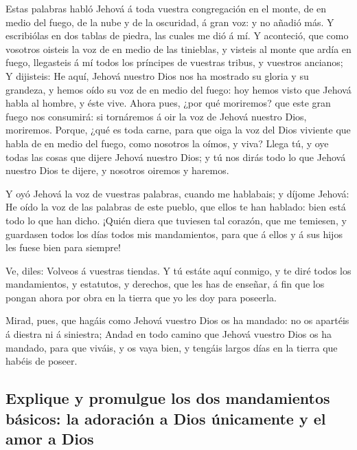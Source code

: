  Estas palabras habló Jehová á toda vuestra congregación
en el monte, de en medio del fuego, de la nube y de la oscuridad, á gran
voz: y no añadió más. Y escribiólas en dos tablas de piedra, las cuales
me dió á mí.  Y aconteció, que como vosotros oisteis la
voz de en medio de las tinieblas, y visteis al monte que ardía en fuego,
llegasteis á mí todos los príncipes de vuestras tribus, y vuestros
ancianos;  Y dijisteis: He aquí, Jehová nuestro Dios nos
ha mostrado su gloria y su grandeza, y hemos oído su voz de en medio del
fuego: hoy hemos visto que Jehová habla al hombre, y éste vive.
 Ahora pues, ¿por qué moriremos? que este gran fuego nos
consumirá: si tornáremos á oir la voz de Jehová nuestro Dios, moriremos.
 Porque, ¿qué es toda carne, para que oiga la voz del
Dios viviente que habla de en medio del fuego, como nosotros la oímos, y
viva?  Llega tú, y oye todas las cosas que dijere Jehová
nuestro Dios; y tú nos dirás todo lo que Jehová nuestro Dios te dijere,
y nosotros oiremos y haremos.

 Y oyó Jehová la voz de vuestras palabras, cuando me
hablabais; y díjome Jehová: He oído la voz de las palabras de este
pueblo, que ellos te han hablado: bien está todo lo que han dicho.
 ¡Quién diera que tuviesen tal corazón, que me temiesen,
y guardasen todos los días todos mis mandamientos, para que á ellos y á
sus hijos les fuese bien para siempre!

 Ve, diles: Volveos á vuestras tiendas.  Y
tú estáte aquí conmigo, y te diré todos los mandamientos, y estatutos, y
derechos, que les has de enseñar, á fin que los pongan ahora por obra en
la tierra que yo les doy para poseerla.

 Mirad, pues, que hagáis como Jehová vuestro Dios os ha
mandado: no os apartéis á diestra ni á siniestra;  Andad
en todo camino que Jehová vuestro Dios os ha mandado, para que viváis, y
os vaya bien, y tengáis largos días en la tierra que habéis de poseer.

\hypertarget{explique-y-promulgue-los-dos-mandamientos-buxe1sicos-la-adoraciuxf3n-a-dios-uxfanicamente-y-el-amor-a-dios}{%
\subsection{Explique y promulgue los dos mandamientos básicos: la
adoración a Dios únicamente y el amor a
Dios}\label{explique-y-promulgue-los-dos-mandamientos-buxe1sicos-la-adoraciuxf3n-a-dios-uxfanicamente-y-el-amor-a-dios}}


